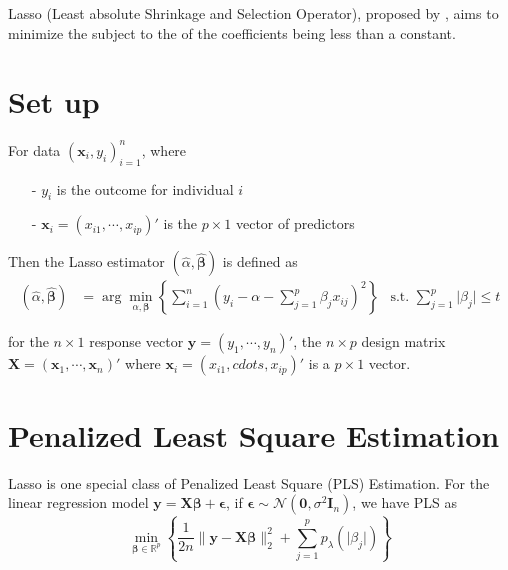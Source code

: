 \documentclass[twoside]{article}
\begin{document}

Lasso (Least absolute Shrinkage and Selection Operator), proposed by \citet{tibshirani1996regression}, aims to minimize the  subject to the  of the coefficients being less than a constant.

\section{Set up}
For data $\left(\mathbf{x}_i,y_i\right)^n_{i=1}$, where
\begin{itemize}
    \item[-] $y_i$ is the outcome for individual $i$
    \item[-] $\mathbf{x}_i = \left(x_{i1},\cdots,x_{ip}\right)'$ is the $p\times 1$ vector of predictors
\end{itemize}
Then the Lasso estimator $\left(\hat{\alpha},\hat{\boldsymbol{\beta}}\right)$ is defined as 
\begin{align*}
    \left(\hat{\alpha},\hat{\boldsymbol{\beta}}\right) &= \arg\min_{\alpha,\boldsymbol{\beta}}\left\{ \sum^n_{i=1}\left(y_i-\alpha-\sum^p_{j=1}\beta_jx_{ij}\right)^2 \right\} & \text{s.t. }\sum^p_{j=1}\lvert \beta_j \rvert\leq t
\end{align*}


for the $n\times 1$ response vector $\mathbf{y}=\left( y_1,\cdots,y_n \right)'$, the $n\times p$ design matrix $\mathbf{X}=\left(\mathbf{x}_1,\cdots,\mathbf{x}_n\right)'$ where $\mathbf{x}_i= \left( x_{i1},cdots,x_{ip} \right)' $ is a $p\times 1$ vector.

\section{Penalized Least Square Estimation}
Lasso is one special class of Penalized Least Square (PLS) Estimation. For the linear regression model $\mathbf{y}=\mathbf{X}\boldsymbol{\beta}+\boldsymbol{\epsilon}$, if $\boldsymbol{\epsilon} \sim \mathcal{N}(\mathbf{0},\sigma^2 \mathbf{I}_n)$, we have PLS as
$$
\min_{\boldsymbol{\beta}\in \mathbb{R}^p}\left\{ \frac{1}{2n} \lVert \mathbf{y}-\mathbf{X}\boldsymbol{\beta} \rVert^2_2 + \sum^p_{j=1}p_{\lambda}\left( \lvert \beta_j \rvert \right) \right\}
$$
\end{document}
